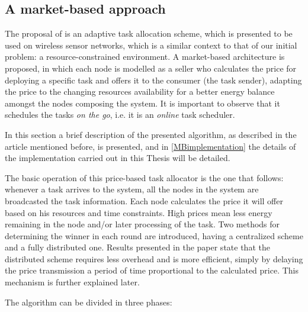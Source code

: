 \subsection{A market-based approach}

The proposal of \citep{Edalat09} is an adaptive task allocation scheme, which is presented to be used on wireless sensor networks, which is a similar context to that of our initial problem: a resource-constrained environment. A market-based architecture is proposed, in which each node is modelled as a seller who calculates the price for deploying a specific task and offers it to the consumer (the task sender), adapting the price to the changing resources availability for a better energy balance amongst the nodes composing the system. It is important to observe that it schedules the tasks \emph{on the go}, i.e. it is an \emph{online} task scheduler.

In this section a brief description of the presented algorithm, as described in the article mentioned before, is presented, and in \ref{MBimplementation} the details of the implementation carried out in this Thesis will be detailed.

The basic operation of this price-based task allocator is the one that follows: whenever a task arrives to the system, all the nodes in the system are broadcasted the task information. Each node calculates the price it will offer based on his resources and time constraints. High prices mean less energy remaining in the node and/or later processing of the task. Two methods for determining the winner in each round are introduced, having a centralized scheme and a fully distributed one. Results presented in the paper state that the distributed scheme requires less overhead and is more efficient, simply by delaying the price transmission a period of time proportional to the calculated price. This mechanism is further explained later.

The algorithm can be divided in three phases:

